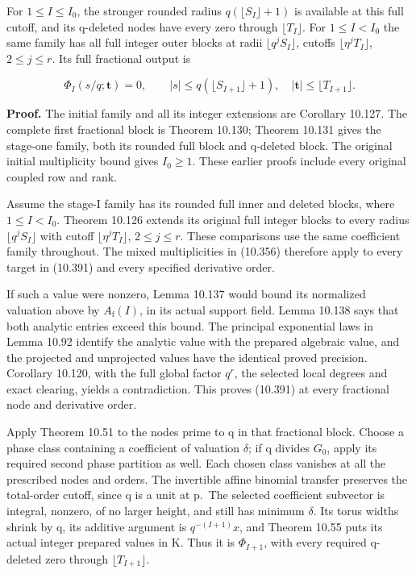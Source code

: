 \documentclass[
  11pt,
  a4paper,
]{article}
\begin{document}
For \(1\le I\le I_0\), the stronger rounded radius
\(q(\lfloor S_I\rfloor+1)\) is available at this full cutoff, and its
q-deleted nodes have every zero through \(\lfloor T_I\rfloor\). For
\(1\le I<I_0\) the same family has all full integer outer blocks at
radii \(\lfloor q^jS_I\rfloor\), cutoffs \(\lfloor\eta^jT_I\rfloor\),
\(2\le j\le r\). Its full fractional output is

\[
\Phi_I(s/q;\boldsymbol t)=0,
\qquad |s|\le q(\lfloor S_{I+1}\rfloor+1),\quad
|\boldsymbol t|\le\lfloor T_{I+1}\rfloor.
\tag{10.391}
\]

\textbf{Proof.} The initial family and all its integer extensions are
Corollary 10.127. The complete first fractional block is Theorem 10.130;
Theorem 10.131 gives the stage-one family, both its rounded full block
and q-deleted block. The original initial multiplicity bound gives
\(I_0\ge1\). These earlier proofs include every original coupled row and
rank.

Assume the stage-I family has its rounded full inner and deleted blocks,
where \(1\le I<I_0\). Theorem 10.126 extends its original full integer
blocks to every radius \(\lfloor q^jS_I\rfloor\) with cutoff
\(\lfloor\eta^jT_I\rfloor\), \(2\le j\le r\). These comparisons use the
same coefficient family throughout. The mixed multiplicities in (10.356)
therefore apply to every target in (10.391) and every specified
derivative order.

If such a value were nonzero, Lemma 10.137 would bound its normalized
valuation above by \(A_{\mathrm f}(I)\), in its actual support field.
Lemma 10.138 says that both analytic entries exceed this bound. The
principal exponential laws in Lemma 10.92 identify the analytic value
with the prepared algebraic value, and the projected and unprojected
values have the identical proved precision. Corollary 10.120, with the
full global factor \(q^r\), the selected local degrees and exact
clearing, yields a contradiction. This proves (10.391) at every
fractional node and derivative order.

Apply Theorem 10.51 to the nodes prime to q in that fractional block.
Choose a phase class containing a coefficient of valuation \(\delta\);
if q divides \(G_0\), apply its required second phase partition as well.
Each chosen class vanishes at all the prescribed nodes and orders. The
invertible affine binomial transfer preserves the total-order cutoff,
since q is a unit at p.~The selected coefficient subvector is integral,
nonzero, of no larger height, and still has minimum \(\delta\). Its
torus widths shrink by q, its additive argument is \(q^{-(I+1)}x\), and
Theorem 10.55 puts its actual integer prepared values in K. Thus it is
\(\Phi_{I+1}\), with every required q-deleted zero through
\(\lfloor T_{I+1}\rfloor\).
\end{document}
